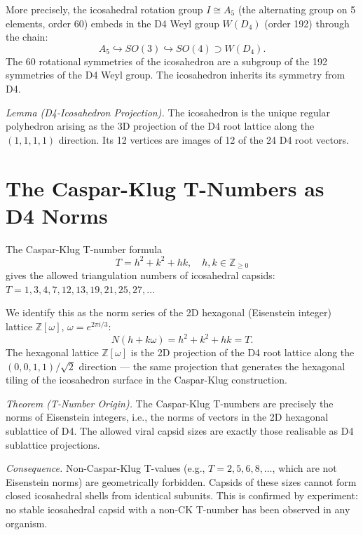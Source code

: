\documentclass[aps,prl,preprint,superscriptaddress,floatfix]{revtex4-2}
\begin{document}
More precisely, the icosahedral rotation group $I \cong A_5$ (the
alternating group on 5 elements, order 60) embeds in the D4 Weyl
group $W(D_4)$ (order 192) through the chain:
\begin{equation}
A_5 \hookrightarrow SO(3) \hookrightarrow SO(4) \supset W(D_4).
\end{equation}
The 60 rotational symmetries of the icosahedron are a subgroup of
the 192 symmetries of the D4 Weyl group. The icosahedron inherits
its symmetry from D4.

\textit{Lemma (D4-Icosahedron Projection).} The icosahedron is the
unique regular polyhedron arising as the 3D projection of the D4
root lattice along the $(1,1,1,1)$ direction. Its 12 vertices are
images of 12 of the 24 D4 root vectors.

\section{The Caspar-Klug T-Numbers as D4 Norms}

The Caspar-Klug T-number formula
\begin{equation}
T = h^2 + k^2 + hk, \quad h, k \in \mathbb{Z}_{\geq 0}
\end{equation}
gives the allowed triangulation numbers of icosahedral capsids:
$T = 1, 3, 4, 7, 12, 13, 19, 21, 25, 27, \ldots$

We identify this as the norm series of the 2D hexagonal
(Eisenstein integer) lattice $\mathbb{Z}[\omega]$, $\omega = e^{2\pi i/3}$:
\begin{equation}
N(h + k\omega) = h^2 + k^2 + hk = T.
\end{equation}
The hexagonal lattice $\mathbb{Z}[\omega]$ is the 2D projection of
the D4 root lattice along the $(0,0,1,1)/\sqrt{2}$ direction --- the
same projection that generates the hexagonal tiling of the icosahedron
surface in the Caspar-Klug construction.

\textit{Theorem (T-Number Origin).} The Caspar-Klug T-numbers are
precisely the norms of Eisenstein integers, i.e., the norms of vectors
in the 2D hexagonal sublattice of D4. The allowed viral capsid sizes
are exactly those realisable as D4 sublattice projections.

\textit{Consequence.} Non-Caspar-Klug T-values (e.g., $T = 2, 5, 6,
8, \ldots$, which are not Eisenstein norms) are geometrically
forbidden. Capsids of these sizes cannot form closed icosahedral
shells from identical subunits. This is confirmed by experiment:
no stable icosahedral capsid with a non-CK T-number has been observed
in any organism.
\end{document}

